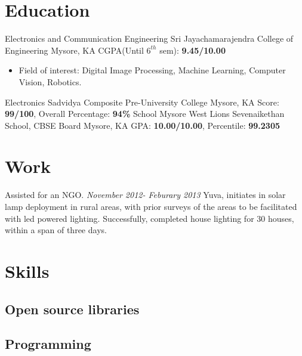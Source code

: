 \documentclass{Resume}
\begin{document}
\makecvtitle
\section{Education \faBook}
	{Electronics and Communication Engineering}
	{Sri Jayachamarajendra College of Engineering}
	{Mysore, KA}
	{CGPA(Until $6^{th}$ sem): \textbf{9.45/10.00}}{}
		\begin{itemize}
			\item Field of interest: Digital Image Processing, Machine Learning, Computer Vision, Robotics.
		\end{itemize}
	{Electronics}
	{Sadvidya Composite Pre-University College}
	{Mysore, KA}
	{Score: \textbf{99/100}, Overall Percentage: \textbf{94\%}}{}
	{School}
	{Mysore West Lions Sevenaikethan School, CBSE Board}
	{Mysore, KA}
	{GPA: \textbf{10.00/10.00}, Percentile: \textbf{99.2305}}{}

\section{Work  \faSuitcase}
{Assisted for an NGO.}
{\textit{November 2012- Feburary 2013}}
{Yuva, initiates in solar lamp deployment in rural areas, with prior surveys of the areas to be facilitated with led powered lighting.}
{Successfully, completed house lighting for 30 houses, within a span of three days.}

\section{Skills \faBolt}

\subsection{Open source libraries}
\subsection{Programming}
\end{document}
